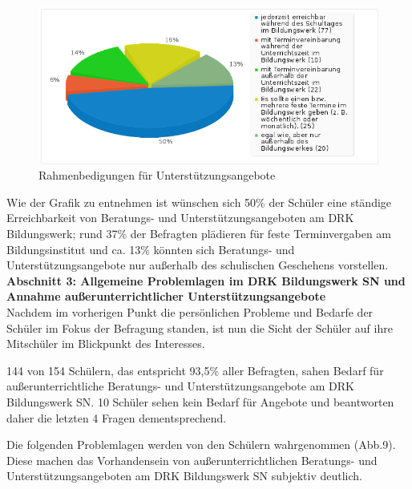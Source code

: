 \begin{figure}[hp]
	\centering
		\includegraphics[width=1.0\textwidth]{images/Rahmenbedingungen-fuer-Unterstuetzungangebote.png}
	\caption{Rahmenbedigungen für Unterstützungsangebote}
	\label{fig:Rahmenbedingungen-fuer-Unterstuetzungangebote}
\end{figure}

Wie der Grafik zu entnehmen ist wünschen sich 50\% der Schüler eine ständige Erreichbarkeit von Beratungs- und Unterstützungsangeboten am DRK Bildungswerk; rund 37\% der Befragten plädieren für feste Terminvergaben am Bildungsinstitut und ca. 13\% könnten sich Beratungs- und Unterstützungsangebote nur außerhalb des schulischen Geschehens vorstellen.\\

\textbf{Abschnitt 3: Allgemeine Problemlagen im DRK Bildungswerk SN und Annahme außerunterrichtlicher Unterstützungsangebote}\\

Nachdem im vorherigen Punkt die persönlichen Probleme und Bedarfe der Schüler im Fokus der Befragung standen, ist nun die Sicht der Schüler auf ihre Mitschüler im Blickpunkt des Interesses.

144 von 154 Schülern, das entspricht 93,5\% aller Befragten, sahen Bedarf für außerunterrichtliche Beratungs- und Unterstützungsangebote am DRK Bildungswerk SN. 10 Schüler sehen kein Bedarf für Angebote und beantworten daher die letzten 4 Fragen dementsprechend.

Die folgenden Problemlagen werden von den Schülern wahrgenommen (Abb.9). Diese machen das Vorhandensein von außerunterrichtlichen Beratungs- und Unterstützungsangeboten am DRK Bildungswerk SN subjektiv deutlich.

